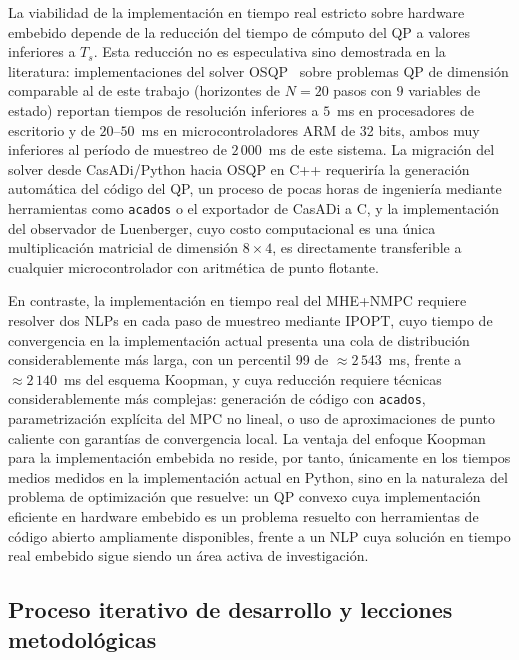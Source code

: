 \documentclass[12pt,letterpaper]{article}
\begin{document}
La viabilidad de la implementación en tiempo real estricto sobre 
hardware embebido depende de la reducción del tiempo de cómputo 
del QP a valores inferiores a $T_s$. Esta reducción no es 
especulativa sino demostrada en la literatura: implementaciones 
del solver OSQP~\cite{stellato2020} sobre problemas QP de 
dimensión comparable al de este trabajo (horizontes de $N = 20$ 
pasos con $9$ variables de estado) reportan tiempos de resolución 
inferiores a $5$~ms en procesadores de escritorio y de $20$--$50$~ms 
en microcontroladores ARM de 32 bits, ambos muy inferiores al 
período de muestreo de $2\,000$~ms de este sistema. La migración 
del solver desde CasADi/Python hacia OSQP en C++ requeriría la 
generación automática del código del QP, un proceso de pocas
horas de ingeniería mediante herramientas como \texttt{acados} o
el exportador de CasADi a C, y la implementación del observador
de Luenberger, cuyo costo computacional es una única multiplicación 
matricial de dimensión $8 \times 4$, es directamente transferible 
a cualquier microcontrolador con aritmética de punto flotante.

En contraste, la implementación en tiempo real del MHE+NMPC 
requiere resolver dos NLPs en cada paso de muestreo mediante IPOPT, 
cuyo tiempo de convergencia en la implementación actual presenta 
una cola de distribución considerablemente más larga, con un
percentil 99 de $\approx 2\,543$~ms, frente a $\approx 2\,140$~ms
del esquema Koopman, y cuya reducción requiere técnicas
considerablemente más complejas: generación de código con 
\texttt{acados}, parametrización explícita del MPC no lineal, o 
uso de aproximaciones de punto caliente con garantías de 
convergencia local. La ventaja del enfoque Koopman para la 
implementación embebida no reside, por tanto, únicamente en los 
tiempos medios medidos en la implementación actual en Python, sino 
en la naturaleza del problema de optimización que resuelve: un QP 
convexo cuya implementación eficiente en hardware embebido es un 
problema resuelto con herramientas de código abierto ampliamente 
disponibles, frente a un NLP cuya solución en tiempo real 
embebido sigue siendo un área activa de investigación.

\subsection{Proceso iterativo de desarrollo y lecciones 
metodológicas}
\label{sec:discusion_iterativo}
\end{document}
